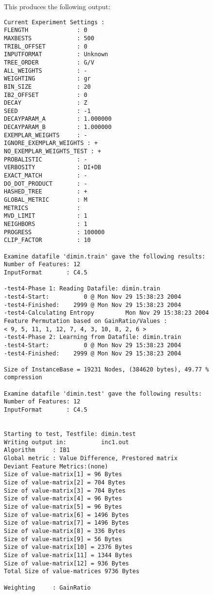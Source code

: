 This produces the following output:
\begin{footnotesize}
\begin{verbatim}
Current Experiment Settings :
FLENGTH              : 0
MAXBESTS             : 500
TRIBL_OFFSET         : 0
INPUTFORMAT          : Unknown
TREE_ORDER           : G/V
ALL_WEIGHTS          : -
WEIGHTING            : gr
BIN_SIZE             : 20
IB2_OFFSET           : 0
DECAY                : Z
SEED                 : -1
DECAYPARAM_A         : 1.000000
DECAYPARAM_B         : 1.000000
EXEMPLAR_WEIGHTS     : -
IGNORE_EXEMPLAR_WEIGHTS : +
NO_EXEMPLAR_WEIGHTS_TEST : +
PROBALISTIC          : -
VERBOSITY            : DI+DB
EXACT_MATCH          : -
DO_DOT_PRODUCT       : -
HASHED_TREE          : +
GLOBAL_METRIC        : M
METRICS              : 
MVD_LIMIT            : 1
NEIGHBORS            : 1
PROGRESS             : 100000
CLIP_FACTOR          : 10

Examine datafile 'dimin.train' gave the following results:
Number of Features: 12
InputFormat       : C4.5

-test4-Phase 1: Reading Datafile: dimin.train
-test4-Start:          0 @ Mon Nov 29 15:38:23 2004
-test4-Finished:    2999 @ Mon Nov 29 15:38:23 2004
-test4-Calculating Entropy         Mon Nov 29 15:38:23 2004
Feature Permutation based on GainRatio/Values :
< 9, 5, 11, 1, 12, 7, 4, 3, 10, 8, 2, 6 >
-test4-Phase 2: Learning from Datafile: dimin.train
-test4-Start:          0 @ Mon Nov 29 15:38:23 2004
-test4-Finished:    2999 @ Mon Nov 29 15:38:23 2004

Size of InstanceBase = 19231 Nodes, (384620 bytes), 49.77 % compression

Examine datafile 'dimin.test' gave the following results:
Number of Features: 12
InputFormat       : C4.5


Starting to test, Testfile: dimin.test
Writing output in:          inc1.out
Algorithm     : IB1
Global metric : Value Difference, Prestored matrix
Deviant Feature Metrics:(none)
Size of value-matrix[1] = 96 Bytes 
Size of value-matrix[2] = 704 Bytes 
Size of value-matrix[3] = 704 Bytes 
Size of value-matrix[4] = 96 Bytes 
Size of value-matrix[5] = 96 Bytes 
Size of value-matrix[6] = 1496 Bytes 
Size of value-matrix[7] = 1496 Bytes 
Size of value-matrix[8] = 336 Bytes 
Size of value-matrix[9] = 56 Bytes 
Size of value-matrix[10] = 2376 Bytes 
Size of value-matrix[11] = 1344 Bytes 
Size of value-matrix[12] = 936 Bytes 
Total Size of value-matrices 9736 Bytes 

Weighting     : GainRatio


\end{verbatim}
\end{footnotesize}
